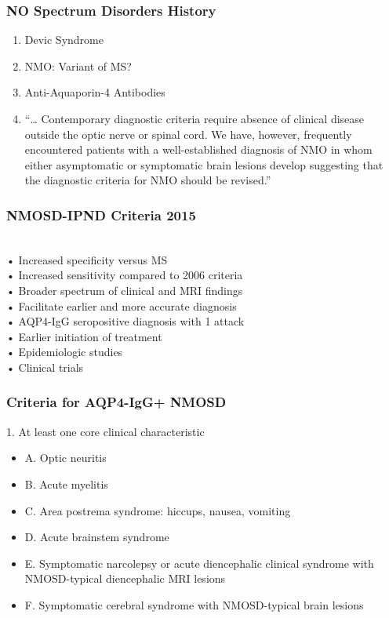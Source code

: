 \begin{itemize}
\begin{itemize}
\subsubsection{NO Spectrum Disorders History}
\begin{enumerate}
    \item Devic Syndrome
    \item NMO: Variant of MS? 
    \item Anti-Aquaporin-4 Antibodies
    \item “… Contemporary diagnostic criteria require
absence of clinical disease outside the optic
nerve or spinal cord.
We have, however, frequently encountered patients
with a well-established diagnosis of NMO in whom
either asymptomatic or symptomatic brain
lesions develop suggesting that the diagnostic
criteria for NMO should be revised.”
\end{enumerate}

\subsubsection{NMOSD-IPND Criteria 2015}
\\• Increased specificity versus MS
\\• Increased sensitivity compared to 2006 criteria
\\• Broader spectrum of clinical and MRI findings
\\• Facilitate earlier and more accurate diagnosis
\\• AQP4-IgG seropositive diagnosis with 1 attack
\\• Earlier initiation of treatment
\\• Epidemiologic studies
\\• Clinical trials

\subsubsection{Criteria for AQP4-IgG+ NMOSD}
1. At least one core clinical characteristic
\begin{itemize}
    \item A. Optic neuritis
\item B. Acute myelitis
\item C. Area postrema syndrome: hiccups, nausea, vomiting
\item D. Acute brainstem syndrome
\item E. Symptomatic narcolepsy or acute diencephalic clinical syndrome with NMOSD-typical
diencephalic MRI lesions
\item F. Symptomatic cerebral syndrome with NMOSD-typical brain lesions
\end{itemize}


\end{itemize}
\end{itemize}

